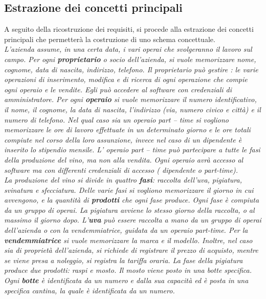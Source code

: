 \documentclass{article}
\begin{document}
\subsection{Estrazione dei concetti principali}
A seguito della ricostruzione dei requisiti, si procede alla estrazione dei concetti principali che permetterà la costruzione di uno schema concettuale.\\
\newline
\newline
\textit{L'azienda assume, in una certa data, i vari operai che svolgeranno il lavoro sul campo. Per ogni \textbf{proprietario} o socio dell'azienda, si vuole memorizzare nome, cognome, data di nascita, indirizzo, telefono.
Il proprietario può gestire : le varie operazioni di inserimento, modifica e di ricerca di ogni operazione che compie ogni operaio e le vendite. Egli può accedere al software con credenziali di amministratore.
Per ogni \textbf{operaio} si vuole memorizzare il numero identificativo, il nome, il cognome, la data di nascita, l'indirizzo (via, numero civico e città) e il numero di telefono.
Nel qual caso sia un operaio part – time si vogliono memorizzare le ore di lavoro effettuate in un determinato giorno e le ore totali compiute nel corso della loro assunzione, invece nel caso di un dipendente è inserito lo stipendio mensile.
L' operaio part – time può partecipare a tutte le fasi della produzione del vino, ma non alla vendita. 
Ogni operaio avrà accesso al software ma con differenti credenziali di accesso ( dipendente o part-time).\\\newline
La produzione del vino si divide in quattro \textbf{fasi}: raccolta dell'uva, pigiatura, svinatura e sfecciatura.
Delle varie fasi si vogliono memorizzare il giorno in cui avvengono, e la quantità di \textbf{prodotti} che ogni fase produce. Ogni fase è compiuta da un gruppo di operai. La pigiatura avviene lo stesso giorno della raccolta, o al massimo il giorno dopo.
L’\textbf{uva} può essere raccolta a mano da un gruppo di operai dell'azienda o con la vendemmiatrice, guidata da un operaio part-time.
Per la \textbf{vendemmiatrice} si vuole memorizzare la marca e il modello. Inoltre, nel caso sia di proprietà dell'azienda, si richiede di registrare il prezzo di acquisto, mentre se viene presa a noleggio, si registra la tariffa oraria.
La fase della pigiatura produce due prodotti: raspi e mosto. Il mosto viene posto in una botte specifica.
Ogni \textbf{botte} è identificata da un numero e dalla sua capacità ed è posta in una specifica cantina, la quale è identificata da un numero.
}
\end{document}
